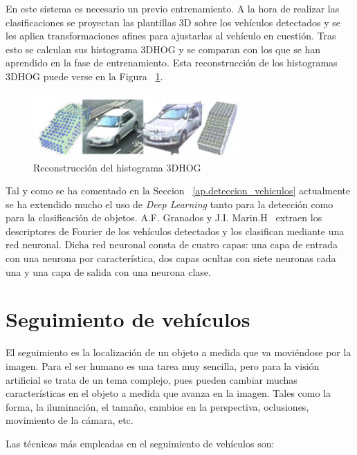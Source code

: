 En este sistema es necesario un previo entrenamiento. A la hora de realizar las clasificaciones se proyectan las plantillas 3D sobre los vehículos detectados y se les aplica transformaciones afines para ajustarlas al vehículo en cuestión. Tras esto se calculan sus histograma 3DHOG y se comparan con los que se han aprendido en la fase de entrenamiento. Esta reconstrucción de los histogramas 3DHOG puede verse en la Figura ~\ref{fig.3dhog_histograma}.

\begin{figure}[H]
  \begin{center}
    \includegraphics[width=0.7\textwidth]{figures/Estado_arte/3dhog_plantilla.png}
		\caption{Reconstrucción  del  histograma  3DHOG}
		\label{fig.3dhog_histograma}
		\end{center}
\end{figure}

Tal y como se ha comentado en la Seccion ~\ref{ap.deteccion_vehiculos} actualmente se ha extendido mucho el uso de \textit{Deep Learning} tanto para la detección como para la clasificación de objetos. 
A.F. Granados y J.I. Marin.H~\cite{deteccion_flujo_vehicular} extraen los descriptores de Fourier de los vehículos detectados y los clasifican mediante una red neuronal. Dicha red neuronal consta de cuatro capas: una capa de entrada con una neurona por característica, dos capas ocultas con siete neuronas cada una y una capa de salida con una neurona clase. 


\section{Seguimiento de vehículos}

El seguimiento es la localización de un objeto a medida que va moviéndose por la imagen. Para el ser humano es una tarea muy sencilla, pero para la visión artificial se trata de un tema complejo, pues pueden cambiar muchas características en el objeto  a medida que avanza en la imagen. Tales como la forma, la iluminación, el tamaño, cambios en la perspectiva, oclusiones, movimiento de la cámara, etc.

Las técnicas más empleadas en el seguimiento de vehículos son:

